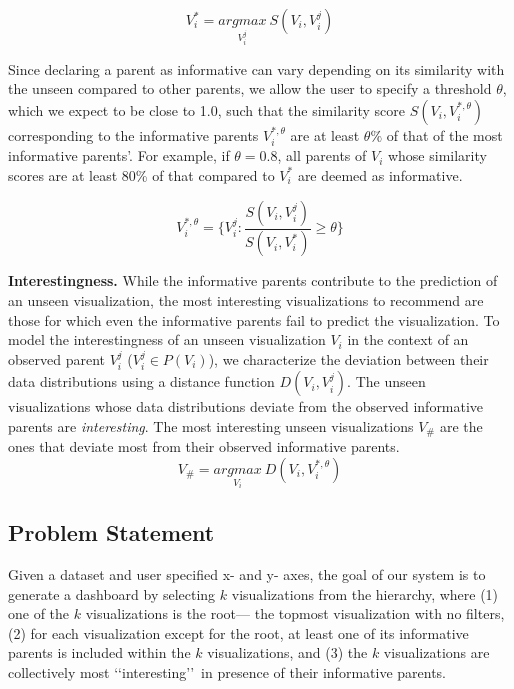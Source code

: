 \begin{equation}
    V_i^*=\underset{V_i^j}{argmax}\ S(V_i, V_i^j)
\end{equation}

Since declaring a parent as informative can vary depending on its similarity with the unseen compared to other parents, we allow the user to specify a threshold $\theta$, which we expect to be close to 1.0, such that the similarity score $S(V_i, V_i^{*, \theta})$ corresponding to the informative parents $V_i^{*, \theta}$ are at least $\theta\%$ of that of the most informative parents'. For example, if $\theta = 0.8$, all parents of $V_i$ whose similarity scores are at least 80\% of that compared to $V_i^*$ are deemed as informative. 

\begin{equation}
    V_i^{*, \theta} = \{V_i^j : \frac{S(V_i, V_i^j)}{S(V_i, V_i^*)} \ge \theta\}
\end{equation}

\textbf{Interestingness.} While the informative parents contribute to the prediction of an unseen visualization, the most interesting visualizations to recommend are those for which even the informative parents fail to predict the visualization. To model the interestingness of an unseen visualization $V_i$ in the context of an observed parent $V_i^j$ ($V_i^j \in P(V_i)$), we characterize the deviation between their data distributions using a distance function $D(V_i, V_i^j)$. The unseen visualizations whose data distributions deviate from the observed informative parents are \emph{interesting}. The most interesting unseen visualizations $V_\#$ are the ones that deviate most from their observed informative parents.
\begin{equation}
    V_\#=\underset{V_i}{argmax} \ D(V_i, V_i^{*, \theta})
\end{equation}


\subsection{Problem Statement}

Given a dataset and user specified x- and y- axes, the goal of our system is to generate a dashboard by selecting $k$ visualizations from the hierarchy, where (1) one of the $k$ visualizations is the root--- the topmost visualization with no filters, (2) for each visualization except for the root, at least one of its informative parents is included within the $k$ visualizations, and (3) the $k$ visualizations are collectively most \lq\lq interesting\rq\rq\ in presence of their informative parents.

